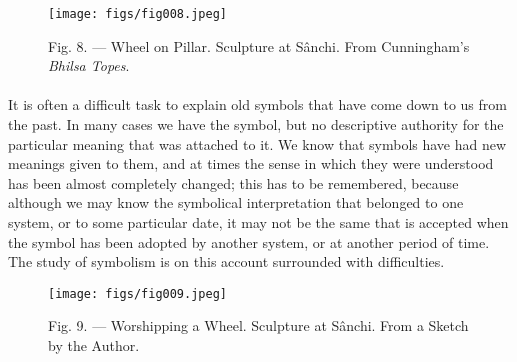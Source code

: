 \documentclass[a4paper, 11pt, oneside, polutonikogreek, english]{article}
\begin{document}
\begin{figure}[H]
\centering
\texttt{[image: figs/fig008.jpeg]}
\caption[Fig. 8. --- Wheel on Pillar.]{Fig. 8. --- Wheel on Pillar. Sculpture at Sânchi. From Cunningham's \emph{Bhilsa Topes}.}
\end{figure}
\paragraph{}
It is often a difficult task to explain old symbols that have come down to us from the past. In many cases we have the symbol, but no descriptive authority for the particular meaning that was attached to it. We know that symbols have had new meanings given to them, and at times the sense in which they were understood has been almost completely changed; this has to be remembered, because although we may know the symbolical interpretation that belonged to one system, or to some particular date, it may not be the same that is accepted when the symbol has been adopted by another system, or at another period of time. The study of symbolism is on this account surrounded with difficulties.

\begin{figure}[H]
\centering
\texttt{[image: figs/fig009.jpeg]}
\caption[Fig. 9. --- Worshipping a Wheel.]{Fig. 9. --- Worshipping a Wheel. Sculpture at Sânchi. From a Sketch by the Author.}
\end{figure}
\end{document}

